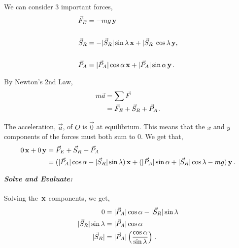 \begin{subquestions}
\begin{subsubquestions}
	We can consider 3 important forces,
	\begin{align}
		\vec{F}_{E} & = -mg\,\mathbf{y} \\ \nonumber \\
		\vec{S}_{R} & = -|\vec{S}_{R}|\sin{\lambda}\,\mathbf{x} +|\vec{S}_{R}|\cos{\lambda}\,\mathbf{y} ,\\ \nonumber \\
		\vec{P}_{A} & = |\vec{P}_{A}|\cos{\alpha}\,\mathbf{x} + |\vec{P}_{A}|\sin{\alpha}\,\mathbf{y}  \,.
	\end{align}
	
	By Newton's 2nd Law,
	\begin{align}
		m\vec{a} & = \sum{\vec{F}} \nonumber \\
		& = \vec{F}_{E} + \vec{S}_{R} + \vec{P}_{A} \,.
	\end{align}
	
	The acceleration, $\vec{a}$, of $O$ is $\vec{0}$ at equilibrium. This means that the $x$ and $y$ components of the forces must both sum to 0. We get that,
	\begin{align}
		0\,\mathbf{x} + 0\,\mathbf{y} & = \vec{F}_{E} + \vec{S}_{R} + \vec{P}_{A} \nonumber \\
		& = (|\vec{P}_{A}|\cos{\alpha} - |\vec{S}_{R}|\sin{\lambda})\,\mathbf{x} + (|\vec{P}_{A}|\sin{\alpha} + |\vec{S}_{R}|\cos{\lambda} - mg)\,\mathbf{y} \,.		
	\end{align}
	
	
	
	\textbf{\textit{Solve and Evaluate:}} \\ \\
	Solving the $\,\mathbf{x}$ components, we get,
	\begin{align}
		0 & = |\vec{P}_{A}|\cos{\alpha} - |\vec{S}_{R}|\sin{\lambda} \nonumber \\
		|\vec{S}_{R}|\sin{\lambda} & = |\vec{P}_{A}|\cos{\alpha} \nonumber \\
		|\vec{S}_{R}| & = |\vec{P}_{A}| \left(\frac{\cos{\alpha}}{\sin{\lambda}}\right) \,.
	\end{align}
	

\end{subsubquestions}
\end{subquestions}
